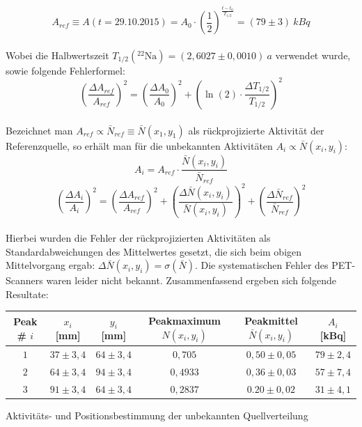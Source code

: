             \begin{equation}
            	A_{ref} \equiv A(t =\textrm{29.10.2015}) = A_0 \cdot \left( \frac{1}{2}\right)^{\frac{t-t_0}{T_{1/2}}} = (79 \pm 3)\ \unit{kBq}
            \end{equation}\\
            Wobei die Halbwertszeit $T_{1/2}(^{22}\textrm{Na}) = (2,6027 \pm 0,0010)\ \unit{a}$ verwendet wurde, sowie folgende Fehlerformel:
            \begin{equation}
                \left(\frac{\Delta A_{ref}}{A_{ref}}\right)^2 = \left(\frac{\Delta A_0}{A_0}\right)^2 + \left(\ln(2) \cdot \frac{\Delta T_{1/2}}{T_{1/2}}\right)^2
            \end{equation}\\   
            Bezeichnet man $A_{ref} \propto \bar{N}_{ref} \equiv \bar{N}(x_1,y_1)$ als rückprojizierte Aktivität der Referenzquelle, so erhält man für die unbekannten Aktivitäten $A_i \propto \bar{N}(x_i,y_i)$:
            \begin{equation}
            	A_i = A_{ref} \cdot \frac{\bar{N}(x_i,y_i)}{\bar{N}_{ref}}
            \end{equation}    
            \begin{equation}
                 \left(\frac{\Delta A_i}{A_i}\right)^2 = \left(\frac{\Delta A_{ref}}{A_{ref}}\right)^2 + \left(\frac{\Delta \bar{N}(x_i,y_i)}{\bar{N}(x_i,y_i)}\right)^2 + \left(\frac{\Delta \bar{N}_{ref}}{\bar{N}_{ref}}\right)^2
             \end{equation}\\   
             Hierbei wurden die Fehler der rückprojizierten Aktivitäten als Standardabweichungen des Mittelwertes gesetzt, die sich beim obigen Mittelvorgang ergab: $\Delta \bar{N}(x_i,y_i) = \sigma(\bar{N})$. Die systematischen Fehler des PET-Scanners waren leider nicht bekannt. Zusammenfassend ergeben sich folgende Resultate:\\
             
             \begin{tabular}{c|c|c|c|c|c}
             				Peak \# $i$ 	& 	$x_i$ [mm] 	& 	$y_i$ [mm] 	& Peakmaximum $N(x_i, y_i)$ & Peakmittel $\bar{N}(x_i,y_i)$ & $A_i$ [kBq]\\
             	\hline		$1$				&	$37 \pm 3,4$& $64 \pm 3,4$&	$0,705$					& $0,50 \pm 0,05$				& $79 \pm 2,4$\\
             				$2$				&	$64 \pm 3,4$& $94 \pm 3,4$&	$0,4933$				& $0,36 \pm 0,03$				& $57 \pm 7,4$\\
             				$3$				&	$91 \pm 3,4$& $64 \pm 3,4$&	$0,2837$				& $0.20 \pm 0,02$				& $31 \pm 4,1$\\
             \end{tabular}
             \caption{Aktivitäts- und Positionsbestimmung der unbekannten Quellverteilung}
             \vspace{3mm}  
                      
